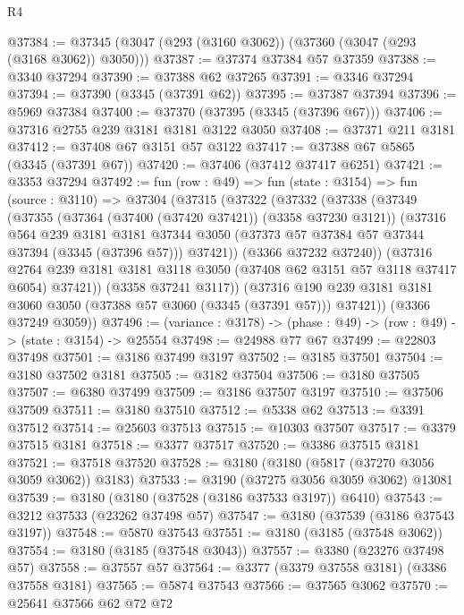 \begin{lexlean}{R4}
\begin{coremodule}
@37384 := @37345 (@3047 (@293 (@3160 @3062)) (@37360 (@3047 (@293 (@3168 @3062)) @3050)))
@37387 := @37374 @37384 @57 @37359
@37388 := @3340 @37294
@37390 := @37388 @62 @37265
@37391 := @3346 @37294
@37394 := @37390 (@3345 (@37391 @62))
@37395 := @37387 @37394
@37396 := @5969 @37384
@37400 := @37370 (@37395 (@3345 (@37396 @67)))
@37406 := @37316 @2755 @239 @3181 @3181 @3122 @3050
@37408 := @37371 @211 @3181
@37412 := @37408 @67 @3151 @57 @3122
@37417 := @37388 @67 @5865 (@3345 (@37391 @67))
@37420 := @37406 (@37412 @37417 @6251)
@37421 := @3353 @37294
@37492 := fun (row : @49) =>
  fun (state : @3154) =>
  fun (source : @3110) =>
  @37304
    (@37315
      (@37322
        (@37332
          (@37338
            (@37349
              (@37355
                (@37364 (@37400 (@37420 @37421)) (@3358 @37230 @3121))
                (@37316
                  @564
                  @239
                  @3181
                  @3181
                  @37344
                  @3050
                  (@37373 @57 @37384 @57 @37344 @37394 (@3345 (@37396 @57)))
                  @37421))
              (@3366 @37232 @37240))
            (@37316
              @2764
              @239
              @3181
              @3181
              @3118
              @3050
              (@37408 @62 @3151 @57 @3118 @37417 @6054)
              @37421))
          (@3358 @37241 @3117))
        (@37316 @190 @239 @3181 @3181 @3060 @3050 (@37388 @57 @3060 (@3345 (@37391 @57))) @37421))
      (@3366 @37249 @3059))
@37496 := (variance : @3178) -> (phase : @49) -> (row : @49) -> (state : @3154) -> @25554
@37498 := @24988 @77 @67
@37499 := @22803 @37498
@37501 := @3186 @37499 @3197
@37502 := @3185 @37501
@37504 := @3180 @37502 @3181
@37505 := @3182 @37504
@37506 := @3180 @37505
@37507 := @6380 @37499
@37509 := @3186 @37507 @3197
@37510 := @37506 @37509
@37511 := @3180 @37510
@37512 := @5338 @62
@37513 := @3391 @37512
@37514 := @25603 @37513
@37515 := @10303 @37507
@37517 := @3379 @37515 @3181
@37518 := @3377 @37517
@37520 := @3386 @37515 @3181
@37521 := @37518 @37520
@37528 := @3180 (@3180 (@5817 (@37270 @3056 @3059 @3062)) @3183)
@37533 := @3190 (@37275 @3056 @3059 @3062) @13081
@37539 := @3180 (@3180 (@37528 (@3186 @37533 @3197)) @6410)
@37543 := @3212 @37533 (@23262 @37498 @57)
@37547 := @3180 (@37539 (@3186 @37543 @3197))
@37548 := @5870 @37543
@37551 := @3180 (@3185 (@37548 @3062))
@37554 := @3180 (@3185 (@37548 @3043))
@37557 := @3380 (@23276 @37498 @57)
@37558 := @37557 @57
@37564 := @3377 (@3379 @37558 @3181) (@3386 @37558 @3181)
@37565 := @5874 @37543
@37566 := @37565 @3062
@37570 := @25641 @37566 @62 @72 @72

\end{coremodule}
\end{lexlean}
